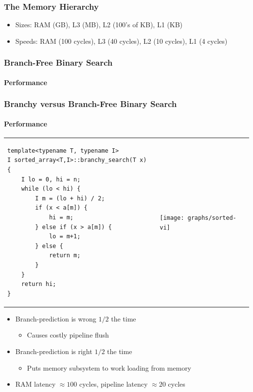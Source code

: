\documentclass[xcolor=dvipsnames]{beamer}
\begin{document}
\begin{frame}
   \frametitle{The Memory Hierarchy}

   \begin{center}
   \end{center}
   \begin{itemize}
     \item<+->Sizes: RAM (GB), L3 (MB), L2 (100's of KB), L1 (KB)
     \item<+->Speeds: RAM (100 cycles), L3 (40 cycles), L2 (10 cycles), L1 (4 cycles)
   \end{itemize}
   
\end{frame}

\begin{frame}
   \frametitle{Branch-Free Binary Search}
   \framesubtitle{Performance}

   \begin{center}
   \end{center}
\end{frame}

\begin{frame}[fragile]
   \frametitle{Branchy versus Branch-Free Binary Search}
   \framesubtitle{Performance}

   \begin{tabular}{m{}m{}}
\tiny
 \begin{verbatim}
template<typename T, typename I>
I sorted_array<T,I>::branchy_search(T x) {
    I lo = 0, hi = n;
    while (lo < hi) {
        I m = (lo + hi) / 2;
        if (x < a[m]) {
            hi = m;
        } else if (x > a[m]) {
            lo = m+1;
        } else {
            return m;
        }
    }
    return hi;
}
\end{verbatim}
&
     \texttt{[image: graphs/sorted-vi]}
\end{tabular}
\begin{itemize}
  \item<+-> Branch-prediction is wrong $1/2$ the time
     \begin{itemize}
       \item<+-> Causes costly pipeline flush
     \end{itemize}
  \item<+-> Branch-prediction is right $1/2$ the time
      \begin{itemize}
       \item<+-> Puts memory subsystem to work loading from memory
     \end{itemize}
  \item<+->RAM latency $\approx100$ cycles, pipeline latency $\approx 20$ cycles
\end{itemize}
\end{frame}
\end{document}
